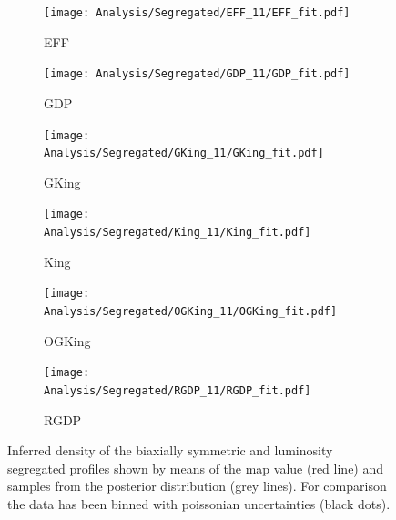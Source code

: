 \begin {figure}
\centering
\begin{subfigure}[t]{0.45\textwidth}
 \texttt{[image: Analysis/Segregated/EFF\_11/EFF\_fit.pdf]}
 \caption{EFF}  
    \end{subfigure}
    \begin{subfigure}[t]{0.45\textwidth}
 \texttt{[image: Analysis/Segregated/GDP\_11/GDP\_fit.pdf]}
 \caption{GDP}  
    \end{subfigure}
    \begin{subfigure}[t]{0.45\textwidth}
 \texttt{[image: Analysis/Segregated/GKing\_11/GKing\_fit.pdf]}
 \caption{GKing}  
    \end{subfigure}
    \begin{subfigure}[t]{0.45\textwidth}
 \texttt{[image: Analysis/Segregated/King\_11/King\_fit.pdf]}
 \caption{King}  
    \end{subfigure}
    \begin{subfigure}[t]{0.45\textwidth}
 \texttt{[image: Analysis/Segregated/OGKing\_11/OGKing\_fit.pdf]}
 \caption{OGKing}  
    \end{subfigure}
        \begin{subfigure}[t]{0.45\textwidth}
 \texttt{[image: Analysis/Segregated/RGDP\_11/RGDP\_fit.pdf]}
 \caption{RGDP}  
    \end{subfigure}
  \caption{Inferred density of the biaxially symmetric and luminosity segregated profiles shown by means of the \gls{map} value (red line) and samples from the posterior distribution (grey lines). 
  For comparison the data has been binned with poissonian uncertainties (black dots).}
\label{fig:PSDSeg}
\end {figure}

